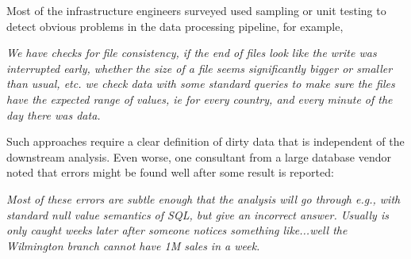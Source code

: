 \vspace{0.5em}

Most of the infrastructure engineers surveyed used sampling or unit testing to detect obvious problems in the data processing pipeline, for example,

\vspace{0.5em}
\emph{We have checks for file consistency, if the end of files look like the write was interrupted early, whether the size of a file seems significantly bigger or smaller than usual, etc. we check data with some standard queries to make sure the files have the expected range of values, ie for every country, and every minute of the day there was data.}

\vspace{0.5em}

Such approaches require a clear definition of dirty data that is independent of the downstream analysis. Even worse, one consultant from a large database vendor noted that errors might be found well after some result is reported:

\vspace{0.5em}
\emph{Most of these errors are subtle enough that the analysis will go through e.g., with standard null value semantics of SQL, but give an incorrect answer. Usually is only caught weeks later after someone notices something like...well the Wilmington branch cannot have 1M sales in a week.}